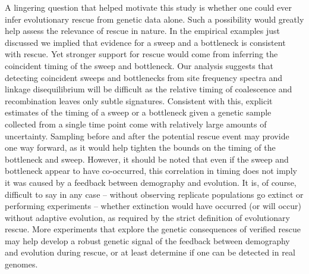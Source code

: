\documentclass[]{article}
\begin{document}
A lingering question that helped motivate this study is whether one could ever infer evolutionary rescue from genetic data alone.
Such a possibility would greatly help assess the relevance of rescue in nature.
In the empirical examples just discussed we implied that evidence for a sweep and a bottleneck is consistent with rescue.
Yet stronger support for rescue would come from inferring the coincident timing of the sweep and bottleneck.
Our analysis suggests that detecting coincident sweeps and bottlenecks from site frequency spectra and linkage disequilibrium will be difficult as the relative timing of coalescence and recombination leaves only subtle signatures.
Consistent with this, explicit estimates of the timing of a sweep \citep[e.g.,][]{ormond2016inferring} or a bottleneck \citep[reviewed in][]{beichman2018using} given a genetic sample collected from a single time point come with relatively large amounts of uncertainty.
Sampling before and after the potential rescue event may provide one way forward, as it would help tighten the bounds on the timing of the bottleneck and sweep.
However, it should be noted that even if the sweep and bottleneck appear to have co-occurred, this correlation in timing does not imply it was caused by a feedback between demography and evolution. 
It is, of course, difficult to say in any case -- without observing replicate populations go extinct or performing experiments -- whether extinction would have occurred (or will occur) without adaptive evolution, as required by the strict definition of evolutionary rescue.
More experiments \citep[such as][]{rego2019dynamics} that explore the genetic consequences of verified rescue may help develop a robust genetic signal of the feedback between demography and evolution during rescue, or at least determine if one can be detected in real genomes.
\end{document}
